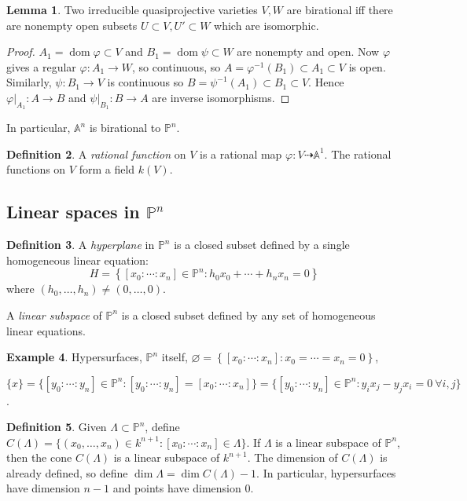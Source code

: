 \documentclass{article}
\newcommand{\A}{\mathbb{A}}
\newcommand{\p}{\mathbb{P}}
\newcommand{\dom}{\operatorname{dom}}
\theoremstyle{definition}
\newtheorem{defn}{Definition}[subsection]
\newtheorem{lemma}[defn]{Lemma}
\newtheorem{example}[defn]{Example}
\begin{document}
\begin{lemma}
\label{lemma:biratiffisoopensub}
Two irreducible quasiprojective varieties $V,W$ are birational iff there are nonempty open subsets $U\subset V,U'\subset W$ which are isomorphic.
\end{lemma}
\begin{proof}
$A_1=\dom\varphi\subset V$ and $B_1=\dom\psi\subset W$ are nonempty and open. Now $\varphi$ gives a regular $\varphi:A_1\rightarrow W$, so continuous, so $A=\varphi^{-1}(B_1)\subset A_1\subset V$ is open. Similarly, $\psi:B_1\rightarrow V$ is continuous so $B=\psi^{-1}(A_1)\subset B_1\subset V$. Hence $\left.\varphi\right|_{A_1}:A\rightarrow B$ and $\left.\psi\right|_{B_1}:B\rightarrow A$ are inverse isomorphisms.
\end{proof}
In particular, $\A^n$ is birational to $\p^n$.

\begin{defn}
A \textit{rational function} on $V$ is a rational map $\varphi:V\dashrightarrow\A^1$. The rational functions on $V$ form a field $k(V)$.
\end{defn}

\subsection{Linear spaces in $\p^n$}
\begin{defn}
A \textit{hyperplane} in $\p^n$ is a closed subset defined by a single homogeneous linear equation:
\[
H=\left\{[x_0:\cdots:x_n]\in\p^n:h_0x_0+\cdots+h_nx_n=0\right\}
\]
where $(h_0,\ldots,h_n)\neq (0,\ldots,0)$.

A \textit{linear subspace} of $\p^n$ is a closed subset defined by any set of homogeneous linear equations.
\end{defn}

\begin{example}
Hypersurfaces, $\p^n$ itself, $\varnothing=\left\{[x_0:\cdots:x_n]:x_0=\cdots=x_n=0\right\}$,

$\{x\}=\{[y_0:\cdots:y_n]\in\p^n:[y_0:\cdots:y_n]=[x_0:\cdots:x_n]\}=\{[y_0:\cdots:y_n]\in\p^n:y_ix_j-y_jx_i=0 \ \forall i,j\}$.
\end{example}

\begin{defn}
Given $\Lambda\subset\p^n$, define $C(\Lambda)=\{(x_0,\ldots,x_n)\in k^{n+1}:[x_0:\cdots:x_n]\in\Lambda\}$. If $\Lambda$ is a linear subspace of $\p^n$, then the cone $C(\Lambda)$ is a linear subspace of $k^{n+1}$. The dimension of $C(\Lambda)$ is already defined, so define $\dim\Lambda=\dim C(\Lambda)-1$. In particular, hypersurfaces have dimension $n-1$ and points have dimension 0.
\end{defn}
\end{document}
